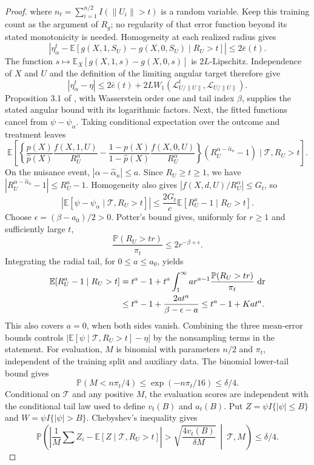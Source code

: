 \documentclass[12pt]{article}
\theoremstyle{plain}
\theoremstyle{definition}
\begin{document}
\begin{proof}
  where $n_t = \sum_{i = 1}^{n/2} I (\|U_i \|> t)$ is a random variable. Keep this training count as the argument of $R_g$; no regularity of that error function beyond its stated monotonicity is needed. Homogeneity at each realized radius gives 
\[
|\eta_\alpha^t-\mathbb E[g(X,1,S_U)-g(X,0,S_U)\mid R_U>t]|\leq2\bar e(t).
\]
 The function $s\mapsto\mathbb E_X[g(X,1,s)-g(X,0,s)]$ is $2L$-Lipschitz. Independence of $X$ and $U$ and the definition of the limiting angular target therefore give 
\[
|\eta_\alpha^t-\eta|\leq2\bar e(t)+2L W_1(\mathcal L_{U/\|U\|}^t,\mathcal L_{U/\|U\|}).
\]
 Proposition 3.1 of \cite{zhang2023wasserstein}, with Wasserstein order one and tail index $\beta$, supplies the stated angular bound with its logarithmic factors. Next, the fitted functions cancel from $\psi-\psi_\alpha$. Taking conditional expectation over the outcome and treatment leaves 
\[
\mathbb E\left[\left\{\frac{p(X)}{\hat p(X)}\frac{f(X,1,U)}{R_U^{\alpha}}-\frac{1-p(X)}{1-\hat p(X)}\frac{f(X,0,U)}{R_U^{\alpha}}\right\}\left(R_U^{\alpha-\hat\alpha_n}-1\right)\mid\mathcal T,R_U>t\right].
\]
 On the nuisance event, $|\alpha-\hat\alpha_n|\leq a$. Since $R_U\geq t\geq1$, we have $|R_U^{\alpha-\hat\alpha_n}-1|\leq R_U^a-1$. Homogeneity also gives $|f(X,d,U)/R_U^{\alpha}|\leq G_t$, so 
\[
|\mathbb E[\psi-\psi_\alpha\mid\mathcal T,R_U>t]|\leq\frac{2G_t}{c}\mathbb E[R_U^a-1\mid R_U>t].
\]
 Choose $\epsilon=(\beta-a_0)/2>0$. Potter's bound gives, uniformly for $r\geq1$ and sufficiently large $t$, 
\[
\frac{\mathbb P(R_U>tr)}{\pi_t}\leq2r^{-\beta+\epsilon}.
\]
 Integrating the radial tail, for $0\leq a\leq a_0$, yields \begin{align*} \mathbb E[R_U^a-1\mid R_U>t]&=t^a-1+t^a\int_1^{\infty}a r^{a-1}\frac{\mathbb P(R_U>tr)}{\pi_t}\,\operatorname{dr}\\ &\leq t^a-1+\frac{2a t^a}{\beta-\epsilon-a}\leq t^a-1+K a t^a. \end{align*} This also covers $a=0$, when both sides vanish. Combining the three mean-error bounds controls $|\mathbb E[\psi\mid\mathcal T,R_U>t]-\eta|$ by the nonsampling terms in the statement. For evaluation, $M$ is binomial with parameters $n/2$ and $\pi_t$, independent of the training split and auxiliary data. The binomial lower-tail bound gives 
\[
\mathbb P(M<n\pi_t/4)\leq\exp(-n\pi_t/16)\leq\delta/4.
\]
 Conditional on $\mathcal T$ and any positive $M$, the evaluation scores are independent with the conditional tail law used to define $v_t(B)$ and $a_t(B)$. Put $Z=\psi I\{|\psi|\leq B\}$ and $W=\psi I\{|\psi|>B\}$. Chebyshev's inequality gives 
\[
\mathbb P\left(\left|\frac1M\sum Z_i-\mathbb E[Z\mid\mathcal T,R_U>t]\right|>\sqrt{\frac{4v_t(B)}{\delta M}}\ \middle|\ \mathcal T,M\right)\leq\delta/4.
\]
\end{proof}
\end{document}
